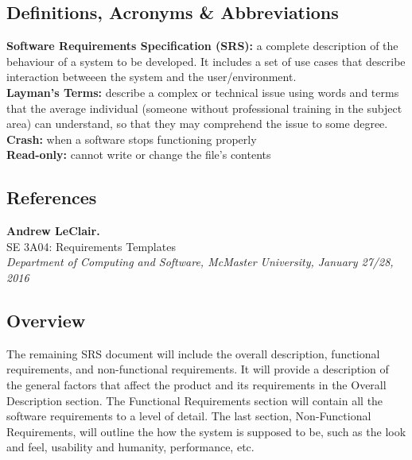 \documentclass[titlepage]{article}
\begin{document}
\subsection{Definitions, Acronyms \& Abbreviations}
\textbf{Software Requirements Specification (SRS):} a complete description of the behaviour of a system to be developed. It includes a set of use cases that describe interaction betweeen the system and the user/environment.\\
\textbf{Layman's Terms:} describe a complex or technical issue using words and terms that the average individual (someone without professional training in the subject area) can understand, so that they may comprehend the issue to some degree.\\
\textbf{Crash:} when a software stops functioning properly\\
\textbf{Read-only:} cannot write or change the file's contents
\subsection{References}
\textbf{Andrew LeClair.}\\
SE 3A04: Requirements Templates\\
\textit{Department of Computing and Software, McMaster University, January 27/28, 2016}
\subsection{Overview}
The remaining SRS document will include the overall description, functional requirements, and non-functional requirements. It will provide a description of the general factors that affect the product and its requirements in the Overall Description section. The Functional Requirements section will contain all the software requirements to a level of detail. The last section, Non-Functional Requirements, will outline the how the system is supposed to be, such as the look and feel, usability and humanity, performance, etc. 
\end{document}
